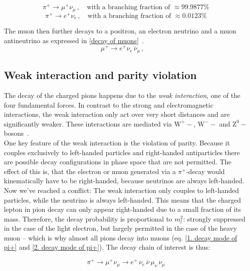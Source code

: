 \documentclass[11pt,a4paper]{article}
\begin{document}
\begin{equation}
\pi^+ \longrightarrow \mu^+ \nu_\mu \, , \quad \text{with a branching fraction of }\approx 99.9877\%
\label{1. decay mode of pi+}
\end{equation}
\begin{equation}
\pi^+ \longrightarrow e^+ \nu_e \, , \quad \text{with a branching fraction of }\approx 0.0123\%
\label{2. decay mode of pi+}
\end{equation}

The muon then further decays to a positron, an electron neutrino and a muon antineutrino as expressed in \autoref{decay of muons}~\cite{PPE at PSI,muon decay}.
\begin{equation}
\mu^+ \longrightarrow e^+  \nu_e  \, \overline{\nu}_\mu\, , \quad
\label{decay of muons}
\end{equation}


\subsection{Weak interaction and parity violation}

The decay of the charged pions happens due to the \textit{weak interaction}, one of the four fundamental forces.
In contrast to the strong and electromagnetic interactions, the weak interaction only act over very short distances and are significantly weaker. These interactions are mediated via $\text{W}^+-$, $\text{W}^--$ and $\text{Z}^0-$bosons~\cite{Povh}.
\\
One key feature of the weak interaction is the violation of parity. Because it couples exclusively to left-handed particles and right-handed antiparticles there are possible decay configurations in phase space that are not permitted. The effect of this is, that the electron or muon generated via a $\pi^+$-decay would kinematically have to be right-handed, because neutrinos are always left-handed.
Now we've reached a conflict: The weak interaction only couples to left-handed particles, while the neutrino is always left-handed. This means that the charged lepton in pion decay can only appear right-handed due to a small fraction of its mass. Therefore, the decay probability is proportional to $m_l^2$: strongly suppressed in the case of the light electron, but largely permitted in the case of the heavy muon – which is why almost all pions decay into muons (eq. \ref{1. decay mode of pi+} and \ref{2. decay mode of pi+}).
The decay chain of interest is thus:

\begin{equation}
\pi^+\longrightarrow \mu^+\nu_\mu  \longrightarrow e^+\, \nu_e \, \overline{\nu}\, \mu_\nu\, \nu_\mu
\label{decay chain}
\end{equation}
\end{document}
